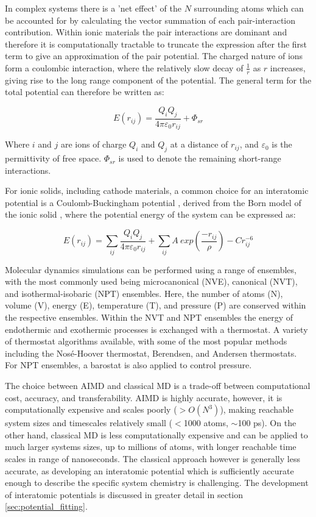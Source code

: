 \documentclass[journal=jacsat,manuscript=article]{achemso}
\begin{document}
In complex systems there is a 'net effect' of the $N$ surrounding atoms which can be accounted for by calculating the vector summation of each pair-interaction contribution. Within ionic materials the pair interactions are dominant and therefore it is computationally tractable to truncate the expression after the first term \cite{harding_computer_1990} to give an approximation of the pair potential. The charged nature of ions form a coulombic interaction, where the relatively slow decay of $\frac{1}{r}$ as $r$ increases, giving rise to the long range component of the potential. The general term for the total potential can therefore be written as:

\begin{equation}
    E(r_{ij}) = \frac{Q_i Q_j}{4\pi \varepsilon_0 r_{ij}} + \Phi_{sr}
\end{equation}

Where $i$ and $j$ are ions of charge $Q_i$ and $Q_j$ at a distance of $r_{ij}$, and $\varepsilon_0$ is the permittivity of free space. $\Phi_{sr}$ is used to denote the remaining short-range interactions.

For ionic solids, including cathode materials, a common choice for an interatomic potential is a Coulomb-Buckingham potential \cite{buckingham_classical_1938}, derived from the Born model of the ionic solid \cite{born_1932, mayer_1932}, where the potential energy of the system can be expressed as:

\begin{equation}
    E(r_{ij}) =  \sum_{ij} \frac{Q_i Q_j}{4\pi \varepsilon_0 r_{ij}} + \sum_{ij} A \ exp(\frac{-r_{ij}}{\rho}) - Cr_{ij}^{-6}
\end{equation}

Molecular dynamics simulations can be performed using a range of ensembles, with the most commonly used being microcanonical (NVE), canonical (NVT), and isothermal-isobaric (NPT) ensembles. Here, the number of atoms (N), volume (V), energy (E), temperature (T), and pressure (P) are conserved within the respective ensembles. Within the NVT and NPT ensembles the energy of endothermic and exothermic processes is exchanged with a thermostat. A variety of thermostat algorithms available, with some of the most popular methods including the Nos\'{e}-Hoover thermostat, Berendsen, and Andersen thermostats. For NPT ensembles, a barostat is also applied to control pressure.

The choice between AIMD and classical MD is a trade-off between computational cost, accuracy, and transferability. AIMD is highly accurate, however, it is computationally expensive and scales poorly ($>O(N^3)$), making reachable system sizes and timescales relatively small ($<$1000 atoms, $\sim$100 ps). On the other hand, classical MD is less computationally expensive and can be applied to much larger systems sizes, up to millions of atoms, with longer reachable time scales in range of nanoseconds. The classical approach however is generally less accurate, as developing an interatomic potential which is sufficiently accurate enough to describe the specific system chemistry is challenging. The development of interatomic potentials is discussed in greater detail in section \ref{sec:potential_fitting}.
\end{document}
